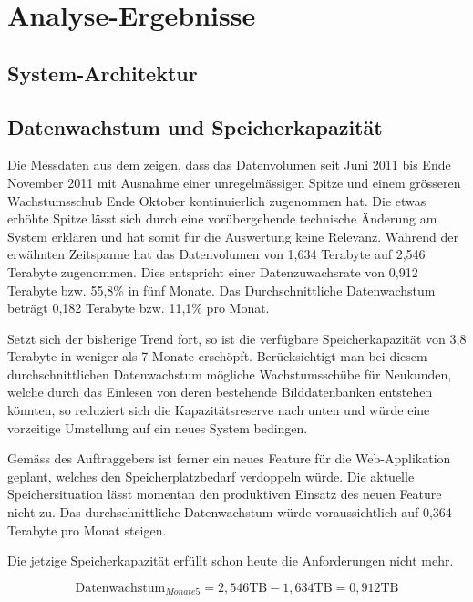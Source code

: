 \section{Analyse-Ergebnisse}

\subsection{System-Architektur}

\subsection{Datenwachstum und Speicherkapazität}
Die Messdaten aus dem   zeigen, dass das Datenvolumen seit  Juni 2011 bis Ende November 2011 mit Ausnahme einer unregelmässigen Spitze und einem grösseren Wachstumsschub Ende Oktober kontinuierlich zugenommen hat. Die etwas erhöhte Spitze lässt sich durch eine vorübergehende technische Änderung am System erklären und hat somit für die Auswertung keine Relevanz. Während der erwähnten Zeitspanne hat das Datenvolumen von 1,634 Terabyte auf 2,546 Terabyte zugenommen. Dies entspricht einer Datenzuwachsrate von 0,912 Terabyte bzw. 55,8\% in fünf Monate. Das Durchschnittliche Datenwachstum beträgt 0,182 Terabyte bzw. 11,1\% pro Monat.

Setzt sich der bisherige Trend fort, so ist die verfügbare Speicherkapazität von 3,8 Terabyte in weniger als 7 Monate erschöpft. Berücksichtigt man bei diesem durchschnittlichen Datenwachstum mögliche Wachstumsschübe für Neukunden, welche durch das Einlesen von deren bestehende Bilddatenbanken entstehen könnten, so reduziert sich die Kapazitätsreserve nach unten und würde eine vorzeitige Umstellung auf ein neues System bedingen.

Gemäss des Auftraggebers ist ferner ein neues Feature für die Web-Applikation geplant, welches den Speicherplatzbedarf verdoppeln würde. Die aktuelle Speichersituation lässt momentan den produktiven Einsatz des neuen Feature nicht zu. Das durchschnittliche Datenwachstum würde voraussichtlich auf 0,364 Terabyte pro Monat steigen.

Die jetzige Speicherkapazität erfüllt schon heute die Anforderungen nicht mehr.

\begin{equation}
\mbox{Datenwachstum}_{Monate5} = 2,546  \mathrm{TB} - 1,634 \mathrm{TB} =  0,912 \mathrm{TB}
\label{eqn:Verfügbarkeit_5Monate}
\end{equation}

